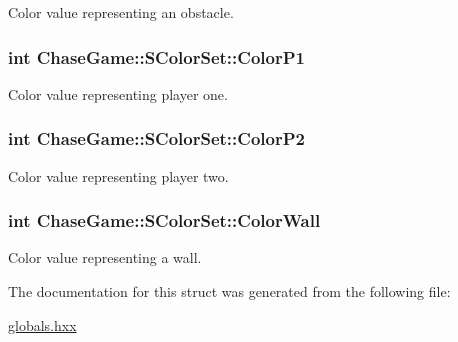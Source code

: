 Color value representing an obstacle. 

\hypertarget{struct_chase_game_1_1_s_color_set_a51e5a557359624fe92be93cb80621922}{
\subsubsection[{Color\-P1}]{\setlength{\rightskip}{0pt plus 5cm}int Chase\-Game\-::\-S\-Color\-Set\-::\-Color\-P1}}\label{struct_chase_game_1_1_s_color_set_a51e5a557359624fe92be93cb80621922}


Color value representing player one. 

\hypertarget{struct_chase_game_1_1_s_color_set_a777bce7519236b269ba44d921f54e4e8}{
\subsubsection[{Color\-P2}]{\setlength{\rightskip}{0pt plus 5cm}int Chase\-Game\-::\-S\-Color\-Set\-::\-Color\-P2}}\label{struct_chase_game_1_1_s_color_set_a777bce7519236b269ba44d921f54e4e8}


Color value representing player two. 

\hypertarget{struct_chase_game_1_1_s_color_set_a7a7a8dae118390ce5b4432aa4d99a474}{
\subsubsection[{Color\-Wall}]{\setlength{\rightskip}{0pt plus 5cm}int Chase\-Game\-::\-S\-Color\-Set\-::\-Color\-Wall}}\label{struct_chase_game_1_1_s_color_set_a7a7a8dae118390ce5b4432aa4d99a474}


Color value representing a wall. 



The documentation for this struct was generated from the following file\-:\begin{DoxyCompactItemize}
\item 
\hyperlink{globals_8hxx}{globals.\-hxx}\end{DoxyCompactItemize}
